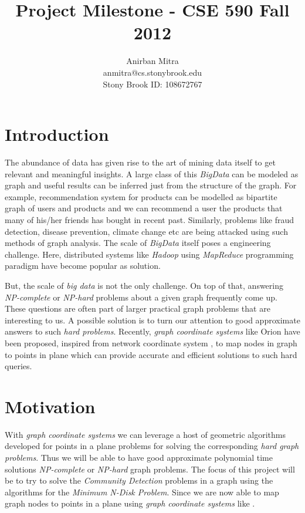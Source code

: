 \documentclass{article}
\title{Project Milestone - CSE 590 Fall 2012}
\author{Anirban Mitra\\
anmitra@cs.stonybrook.edu\\
Stony Brook ID: 108672767}
\begin{document}
    \maketitle
    \section{Introduction}
        The abundance of data has given rise to the art of mining data itself to get relevant and meaningful insights. A large class of this {\em BigData} can be modeled as graph and useful results can be inferred just from the structure of the graph. For example, recommendation system for products can be modelled as bipartite graph of users and products and we can recommend a user the products that many of his/her friends has bought in recent past. Similarly, problems like fraud detection, disease prevention, climate change etc are being attacked using such methods of graph analysis. The scale of {\em BigData} itself poses a engineering challenge. Here, distributed systems like {\em Hadoop} using {\em MapReduce} programming paradigm have become popular as solution.
        
        But, the scale of {\em big data} is not the only challenge. On top of that, answering {\em NP-complete} or {\em NP-hard} problems about a given graph frequently come up. These questions are often part of larger practical graph problems that are interesting to us. A possible solution is to turn our attention to good approximate answers to such {\em hard problems}. Recently, {\em graph coordinate systems} like Orion \cite{Orion} have been proposed, inspired from network coordinate system \cite{Vivaldi}, to map nodes in graph to points in plane which can provide accurate and efficient solutions to such hard queries.
        
    \section{Motivation}
    
        With {\em graph coordinate systems} we can leverage a host of geometric algorithms developed for points in a plane problems for solving the corresponding {\em hard graph problems}. Thus we will be able to have good approximate polynomial time solutions {\em NP-complete} or {\em NP-hard} graph problems. The focus of this project will be to try to solve the {\em Community Detection} problems in a graph using the algorithms for the {\em Minimum N-Disk Problem}. Since we are now able to map graph nodes to points in a plane using {\em graph coordinate systems} like \cite{Vivaldi}.
        
\end{document}

